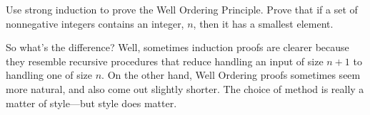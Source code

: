 \begin{editingnotes}
\begin{notesproblem}
Use strong induction to prove the Well Ordering Principle. \hint Prove
that if a set of nonnegative integers contains an integer, $n$, then it
has a smallest element.
\end{notesproblem}
\end{editingnotes}

So what's the difference?  Well, sometimes induction proofs are clearer
because they resemble recursive procedures that reduce handling an input
of size $n+1$ to handling one of size $n$.  On the other hand, Well
Ordering proofs sometimes seem more natural, and also come out slightly
shorter.  The choice of method is really a matter of style---but style
does matter.

\endinput
